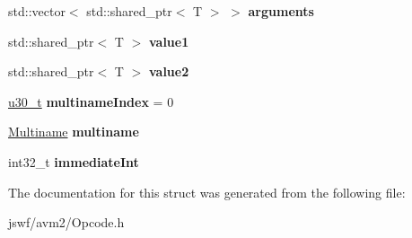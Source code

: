 \begin{DoxyCompactItemize}
\item 
\hypertarget{structjswf_1_1avm2_1_1_opcode_data_a66dd8b828d3de5d1e0023a9d612dd312}{std\+::vector$<$ std\+::shared\+\_\+ptr$<$ T $>$ $>$ {\bfseries arguments}}\label{structjswf_1_1avm2_1_1_opcode_data_a66dd8b828d3de5d1e0023a9d612dd312}

\item 
\hypertarget{structjswf_1_1avm2_1_1_opcode_data_ae70b0e1238966fd8e13ee7f41567b7be}{std\+::shared\+\_\+ptr$<$ T $>$ {\bfseries value1}}\label{structjswf_1_1avm2_1_1_opcode_data_ae70b0e1238966fd8e13ee7f41567b7be}

\item 
\hypertarget{structjswf_1_1avm2_1_1_opcode_data_af0836b3c77b8ed2d9c5725d1d1447c0a}{std\+::shared\+\_\+ptr$<$ T $>$ {\bfseries value2}}\label{structjswf_1_1avm2_1_1_opcode_data_af0836b3c77b8ed2d9c5725d1d1447c0a}

\item 
\hypertarget{structjswf_1_1avm2_1_1_opcode_data_ac9f5a0fbda73e7013ecdc65f952a5c36}{\hyperlink{namespacejswf_aa10d9ddca2a6a5debdc261dfae3d1117}{u30\+\_\+t} {\bfseries multiname\+Index} = 0}\label{structjswf_1_1avm2_1_1_opcode_data_ac9f5a0fbda73e7013ecdc65f952a5c36}

\item 
\hypertarget{structjswf_1_1avm2_1_1_opcode_data_a987588170f8a1cf85cf740d537d4cc9c}{\hyperlink{structjswf_1_1avm2_1_1_multiname}{Multiname} {\bfseries multiname}}\label{structjswf_1_1avm2_1_1_opcode_data_a987588170f8a1cf85cf740d537d4cc9c}

\item 
\hypertarget{structjswf_1_1avm2_1_1_opcode_data_af06dac04773573abcf0763f148760d4c}{int32\+\_\+t {\bfseries immediate\+Int}}\label{structjswf_1_1avm2_1_1_opcode_data_af06dac04773573abcf0763f148760d4c}

\end{DoxyCompactItemize}


The documentation for this struct was generated from the following file\+:\begin{DoxyCompactItemize}
\item 
jswf/avm2/Opcode.\+h\end{DoxyCompactItemize}
